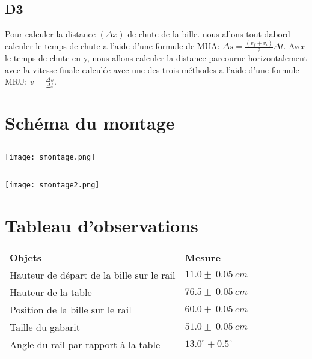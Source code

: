 \documentclass{article}
\begin{document}
        \subsection*{D3}

            Pour calculer la distance $(\Delta x)$ de chute de la bille. nous allons tout dabord calculer le temps de chute a l'aide d'une formule de MUA: $\Delta s = \frac{(v_f + v_i)}{2} \Delta t $. Avec le temps de chute en y, nous allons calculer la distance parcourue horizontalement avec la vitesse finale calculée avec une des trois méthodes a l'aide d'une formule MRU: $v = \frac{\Delta s}{\Delta t}$.

    \vspace{15mm}

    \hfill

    \section{Schéma du montage}
        \subsection{}
        \texttt{[image: smontage.png]}
        \subsection{}
        \texttt{[image: smontage2.png]}


    \hfill

        \section{Tableau d’observations}
        \begin{table}[H]
        \begin{tabular}{llll}
        \textbf{Objets}                                    & \textbf{Mesure}        &  &  \\
        Hauteur de départ de la bille sur le rail & $11.0 \pm \ 0.05 \ cm$ &              &  \\
        Hauteur de la table                       & $76.5 \pm \ 0.05 \ cm$ &              &  \\
        Position de la bille sur le rail          & $60.0 \pm \ 0.05 \ cm$ &              &  \\
        Taille du gabarit                         & $51.0 \pm \ 0.05 \ cm$ &              &  \\
        Angle du rail par rapport à la table      & $13.0^{\circ} \pm 0.5^{\circ}$    &              &
        \end{tabular}
        \end{table}
\end{document}

